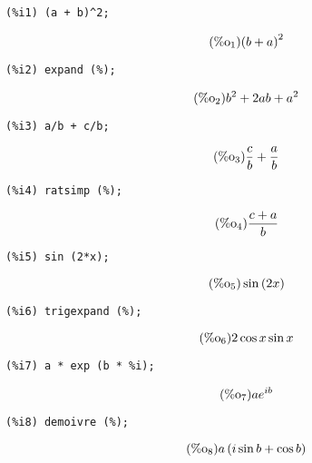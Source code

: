 \documentclass[12pt,leqno]{article}
\begin{document}
\begin{enumerate}
\begin{verbatim}
(%i1) (a + b)^2;
\end{verbatim}
\begin{equation}
\tag{$\mathop{\mathrm{\%o}}_{1}$}{\left(b+a\right)}^{2}
\label{eq:doc-group1-code22-1-1}
\end{equation}
\begin{verbatim}
(%i2) expand (%);
\end{verbatim}
\begin{equation}
\tag{$\mathop{\mathrm{\%o}}_{2}$}{b}^{2}+2 a b+{a}^{2}
\label{eq:doc-group1-code22-2-1}
\end{equation}
\begin{verbatim}
(%i3) a/b + c/b;
\end{verbatim}
\begin{equation}
\tag{$\mathop{\mathrm{\%o}}_{3}$}\frac{c}{b}+\frac{a}{b}
\label{eq:doc-group1-code22-3-1}
\end{equation}
\begin{verbatim}
(%i4) ratsimp (%);
\end{verbatim}
\begin{equation}
\tag{$\mathop{\mathrm{\%o}}_{4}$}\frac{c+a}{b}
\label{eq:doc-group1-code22-4-1}
\end{equation}
\begin{verbatim}
(%i5) sin (2*x);
\end{verbatim}
\begin{equation}
\tag{$\mathop{\mathrm{\%o}}_{5}$}\sin \left(2 x\right)
\label{eq:doc-group1-code22-5-1}
\end{equation}
\begin{verbatim}
(%i6) trigexpand (%);
\end{verbatim}
\begin{equation}
\tag{$\mathop{\mathrm{\%o}}_{6}$}2 \cos x \sin x
\label{eq:doc-group1-code22-6-1}
\end{equation}
\begin{verbatim}
(%i7) a * exp (b * %i);
\end{verbatim}
\begin{equation}
\tag{$\mathop{\mathrm{\%o}}_{7}$}a {e}^{i b}
\label{eq:doc-group1-code22-7-1}
\end{equation}
\begin{verbatim}
(%i8) demoivre (%);
\end{verbatim}
\begin{equation}
\tag{$\mathop{\mathrm{\%o}}_{8}$}a \left(i \sin b+\cos b\right)
\label{eq:doc-group1-code22-8-1}
\end{equation}


\end{enumerate}
\end{document}
